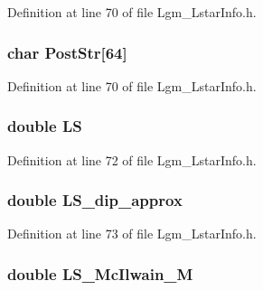 Definition at line 70 of file Lgm\_\-LstarInfo.h.\hypertarget{struct_lgm___lstar_info_450023a7fe05d37b7b67d03dc1efc7ba}{
\subsubsection[{PostStr}]{\setlength{\rightskip}{0pt plus 5cm}char {\bf PostStr}\mbox{[}64\mbox{]}}}
\label{struct_lgm___lstar_info_450023a7fe05d37b7b67d03dc1efc7ba}




Definition at line 70 of file Lgm\_\-LstarInfo.h.\hypertarget{struct_lgm___lstar_info_6ad8261bf3a41eb108787d3d924f5c45}{
\subsubsection[{LS}]{\setlength{\rightskip}{0pt plus 5cm}double {\bf LS}}}
\label{struct_lgm___lstar_info_6ad8261bf3a41eb108787d3d924f5c45}




Definition at line 72 of file Lgm\_\-LstarInfo.h.\hypertarget{struct_lgm___lstar_info_c11d4471d4e71707da1bbfdce47da54c}{
\subsubsection[{LS\_\-dip\_\-approx}]{\setlength{\rightskip}{0pt plus 5cm}double {\bf LS\_\-dip\_\-approx}}}
\label{struct_lgm___lstar_info_c11d4471d4e71707da1bbfdce47da54c}




Definition at line 73 of file Lgm\_\-LstarInfo.h.\hypertarget{struct_lgm___lstar_info_881b139aff4cc429e41c7ec564d32840}{
\subsubsection[{LS\_\-McIlwain\_\-M}]{\setlength{\rightskip}{0pt plus 5cm}double {\bf LS\_\-McIlwain\_\-M}}}
\label{struct_lgm___lstar_info_881b139aff4cc429e41c7ec564d32840}





